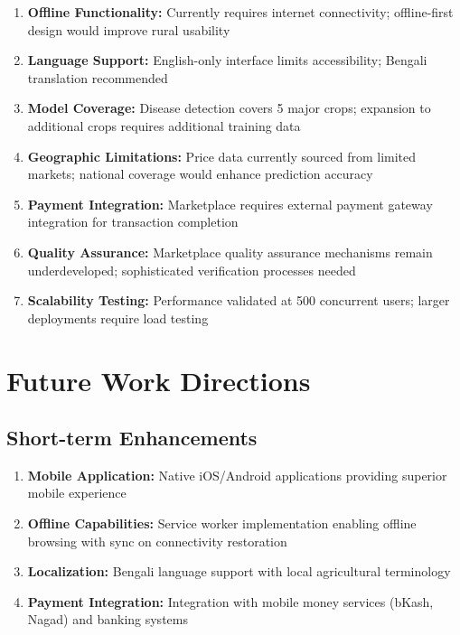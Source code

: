 \documentclass[12pt,a4paper]{report}
\begin{document}
\begin{enumerate}
    \item \textbf{Offline Functionality:} Currently requires internet connectivity; offline-first design would improve rural usability
    
    \item \textbf{Language Support:} English-only interface limits accessibility; Bengali translation recommended
    
    \item \textbf{Model Coverage:} Disease detection covers 5 major crops; expansion to additional crops requires additional training data
    
    \item \textbf{Geographic Limitations:} Price data currently sourced from limited markets; national coverage would enhance prediction accuracy
    
    \item \textbf{Payment Integration:} Marketplace requires external payment gateway integration for transaction completion
    
    \item \textbf{Quality Assurance:} Marketplace quality assurance mechanisms remain underdeveloped; sophisticated verification processes needed
    
    \item \textbf{Scalability Testing:} Performance validated at 500 concurrent users; larger deployments require load testing
\end{enumerate}

\section{Future Work Directions}

\subsection{Short-term Enhancements}

\begin{enumerate}
    \item \textbf{Mobile Application:} Native iOS/Android applications providing superior mobile experience
    
    \item \textbf{Offline Capabilities:} Service worker implementation enabling offline browsing with sync on connectivity restoration
    
    \item \textbf{Localization:} Bengali language support with local agricultural terminology
    
    \item \textbf{Payment Integration:} Integration with mobile money services (bKash, Nagad) and banking systems
\end{enumerate}
\end{document}
